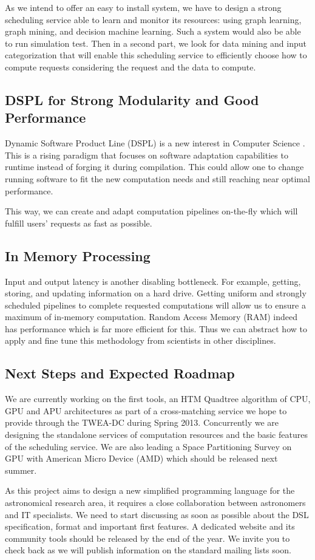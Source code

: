 			As we intend to offer an easy to install system, we have to design a strong scheduling service able to learn and monitor its resources: using graph learning, graph mining, and decision machine learning.
			Such a system would also be able to run simulation test.
			Then in a second part, we look for data mining and input categorization that will enable this scheduling service to efficiently choose how to compute requests considering the request and the data to compute.

		\subsection{DSPL for Strong Modularity and Good Performance}
			Dynamic Software Product Line (DSPL) is a new interest in Computer Science \cite{DSPL}.
			This is a rising paradigm that focuses on software adaptation capabilities to runtime instead of forging it during compilation.
			This could allow one to change running software to fit the new computation needs and still reaching near optimal performance.
			
			This way, we can create and adapt computation pipelines on-the-fly which will fulfill users' requests as fast as possible.
		
		\subsection{In Memory Processing}
			Input and output latency is another disabling bottleneck. For example, getting, storing, and updating information on a hard drive.
			Getting uniform and strongly scheduled pipelines to complete requested computations will allow us to ensure a maximum of in-memory computation.
			Random Access Memory (RAM) indeed has performance which is far more efficient for this.
			Thus we can abstract how to apply and fine tune this methodology from scientists in other disciplines.
			
		\subsection{Next Steps and Expected Roadmap}
			We are currently working on the first tools, an HTM Quadtree algorithm of CPU, GPU and APU architectures as part of a cross-matching service we hope to provide through the TWEA-DC during Spring 2013.
			Concurrently we are designing the standalone services of computation resources and the basic features of the scheduling service.
			We are also leading a Space Partitioning Survey on GPU with American Micro Device (AMD) which should be released next summer.
			
			As this project aims to design a new simplified programming language for the astronomical research area, it requires a close collaboration between astronomers and IT specialists.
			We need to start discussing as soon as possible about the DSL specification, format and important first features.
			A dedicated website and its community tools should be released by the end of the year.
			We invite you to check back as we will publish information on the standard mailing lists soon.


